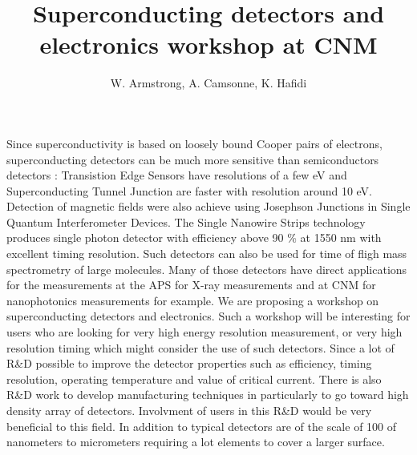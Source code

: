 \documentclass{article}
\title{Superconducting detectors and electronics workshop at CNM}
\author{W. Armstrong, A. Camsonne, K. Hafidi}
\begin{document}
\maketitle
Since superconductivity is based on loosely bound Cooper pairs of electrons, superconducting detectors can be much more sensitive than semiconductors detectors : Transistion Edge Sensors have resolutions of a few eV and Superconducting Tunnel Junction are faster with resolution around 10 eV. Detection of magnetic fields were also achieve using Josephson Junctions in Single Quantum Interferometer Devices. The Single Nanowire Strips technology produces single photon detector with efficiency above 90 \% at 1550 nm with excellent timing resolution. Such detectors can also be used for time of fligh mass spectrometry of large molecules.
Many of those detectors have direct applications for the measurements at the APS for X-ray measurements and at CNM for nanophotonics measurements for example.
We are proposing a workshop on superconducting detectors and electronics.
Such a workshop will be interesting for users who are looking for very high energy resolution measurement, or very high resolution timing which might consider the use of such detectors.
Since a lot of R\&D possible to improve the detector properties such as efficiency, timing resolution, operating temperature and value of critical current. There is also R\&D work to develop manufacturing techniques in particularly to go toward high density array of detectors. Involvment of users in this R\&D would be  very beneficial to this field. In addition to  typical detectors are of the scale of 100 of nanometers to micrometers requiring a lot elements to cover a larger surface.
\end{document}
